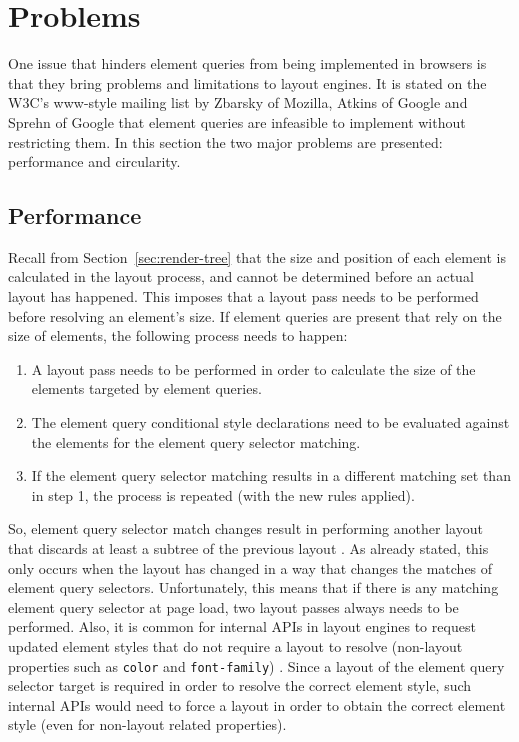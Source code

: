 \documentclass[a4paper,11pt]{kth-mag}
\newcommand{\code}[1]{\texttt{#1}}
\begin{document}
    \section{Problems}\label{sec:eq-problems}
      One issue that hinders element queries from being implemented  in \glspl{browser} is that they bring problems and limitations to \glspl{layout engine}.
      It is stated on the W3C's www-style mailing list \cite{w3c_eq_mail} by Zbarsky of Mozilla, Atkins of Google and Sprehn of Google that element queries are infeasible to implement without restricting them.
      In this section the two major problems are presented: performance and circularity.

      \subsection{Performance}
        Recall from Section~\ref{sec:render-tree} that the size and position of each \gls{element} is calculated in the layout process, and cannot be determined before an actual layout has happened.
        This imposes that a layout pass needs to be performed before resolving an \gls{element}'s size.
        If element queries are present that rely on the size of \glspl{element}, the following process needs to happen:
        \begin{enumerate}
          \item A layout pass needs to be performed in order to calculate the size of the \glspl{element} targeted by element queries.
          \item The element query conditional style declarations need to be evaluated against the \glspl{element} for the element query selector matching.
          \item If the element query selector matching results in a different matching set than in step 1, the process is repeated (with the new rules applied).
        \end{enumerate}
        So, element query selector match changes result in performing another layout that discards at least a subtree of the previous layout \cite{w3c_eq_mail}.
        As already stated, this only occurs when the layout has changed in a way that changes the matches of element query selectors.
        Unfortunately, this means that if there is any matching element query selector at page load, two layout passes always needs to be performed.
        Also, it is common for internal \glspl{API} in \glspl{layout engine} to request updated \gls{element} styles that do not require a layout to resolve (non-layout properties such as \code{color} and \code{font-family}) \cite{w3c_eq_mail}.
        Since a layout of the element query selector target is required in order to resolve the correct \gls{element} style, such internal \glspl{API} would need to force a layout in order to obtain the correct \gls{element} style (even for non-layout related properties).
\end{document}
